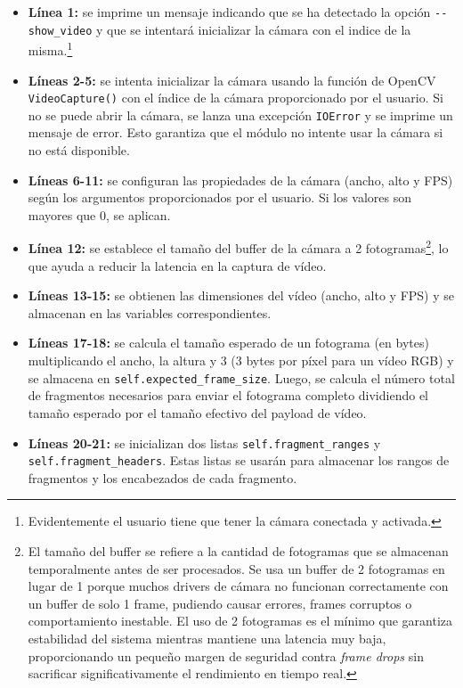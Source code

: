 \begin{itemize}
    \item \textbf{Línea 1:} se imprime un mensaje indicando que se ha detectado la opción \verb|--show_video| y que se intentará inicializar la cámara con el indice de la misma.\footnote{Evidentemente el usuario tiene que tener la cámara conectada y activada.}
    \item \textbf{Líneas 2-5:} se intenta inicializar la cámara usando la función de OpenCV \texttt{VideoCapture()} con el índice de la cámara proporcionado por el usuario. Si no se puede abrir la cámara, se lanza una excepción \texttt{IOError} y se imprime un mensaje de error. Esto garantiza que el módulo no intente usar la cámara si no está disponible.
    \item \textbf{Líneas 6-11:} se configuran las propiedades de la cámara (ancho, alto y FPS) según los argumentos proporcionados por el usuario. Si los valores son mayores que 0, se aplican.
    \item \textbf{Línea 12:} se establece el tamaño del buffer de la cámara a 2 fotogramas\footnote{El tamaño del buffer se refiere a la cantidad de fotogramas que se almacenan temporalmente antes de ser procesados. Se usa un buffer de 2 fotogramas en lugar de 1 porque muchos drivers de cámara no funcionan correctamente con un buffer de solo 1 frame, pudiendo causar errores, frames corruptos o comportamiento inestable. El uso de 2 fotogramas es el mínimo que garantiza estabilidad del sistema mientras mantiene una latencia muy baja, proporcionando un pequeño margen de seguridad contra \textit{frame drops} sin sacrificar significativamente el rendimiento en tiempo real.}, lo que ayuda a reducir la latencia en la captura de vídeo.
    \item \textbf{Líneas 13-15:} se obtienen las dimensiones del vídeo (ancho, alto y FPS) y se almacenan en las variables correspondientes.
    \item \textbf{Líneas 17-18:} se calcula el tamaño esperado de un fotograma (en bytes) multiplicando el ancho, la altura y 3 (3 bytes por píxel para un vídeo RGB) y se almacena en \texttt{self.expected\_frame\_size}. Luego, se calcula el número total de fragmentos necesarios para enviar el fotograma completo dividiendo el tamaño esperado por el tamaño efectivo del payload de vídeo.
    \item \textbf{Líneas 20-21:} se inicializan dos listas \texttt{self.fragment\_ranges} y \texttt{self.fragment\_headers}. Estas listas se usarán para almacenar los rangos de fragmentos y los encabezados de cada fragmento.

\end{itemize}
